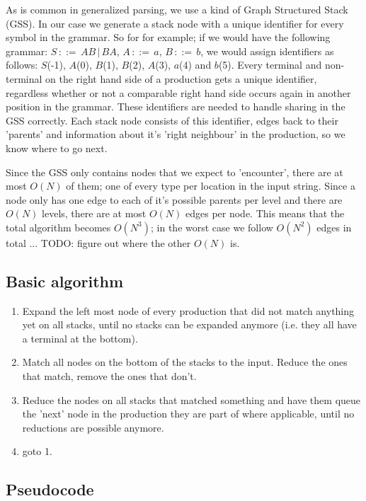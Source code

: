 \documentclass[a4paper,10pt]{article}
\begin{document}
As is common in generalized parsing, we use a kind of Graph Structured Stack (GSS). In our case we generate a stack node with a unique identifier for every symbol in the grammar. So for for example; if we would have the following grammar: $S\,::=\,AB\,|\,BA,\,A\,::=\,a,\,B\,::=\,b$, we would assign identifiers as follows: $S$(-1), $A$(0), $B$(1), $B$(2), $A$(3), $a$(4) and $b$(5). Every terminal and non-terminal on the right hand side of a production gets a unique identifier, regardless whether or not a comparable right hand side occurs again in another position in the grammar. These identifiers are needed to handle sharing in the GSS correctly. Each stack node consists of this identifier, edges back to their 'parents' and information about it's 'right neighbour' in the production, so we know where to go next.

Since the GSS only contains nodes that we expect to 'encounter', there are at most $O(N)$ of them; one of every type per location in the input string. Since a node only has one edge to each of it's possible parents per level and there are $O(N)$ levels, there are at most $O(N)$ edges per node. This means that the total algorithm becomes $O(N^3)$; in the worst case we follow $O(N^2)$ edges in total ... TODO: figure out where the other $O(N)$ is.

\subsection{Basic algorithm}

\begin{enumerate}
 \setlength{\itemsep}{0pt}
 \setlength{\parskip}{0pt}
 \setlength{\parsep}{0pt}

 \item Expand the left most node of every production that did not match anything yet on all stacks, until no stacks can be expanded anymore (i.e. they all have a terminal at the bottom).
 \item Match all nodes on the bottom of the stacks to the input. Reduce the ones that match, remove the ones that don't.
 \item Reduce the nodes on all stacks that matched something and have them queue the 'next' node in the production they are part of where applicable, until no reductions are possible anymore.
 \item goto 1.
\end{enumerate}

\subsection{Pseudocode}
\end{document}
